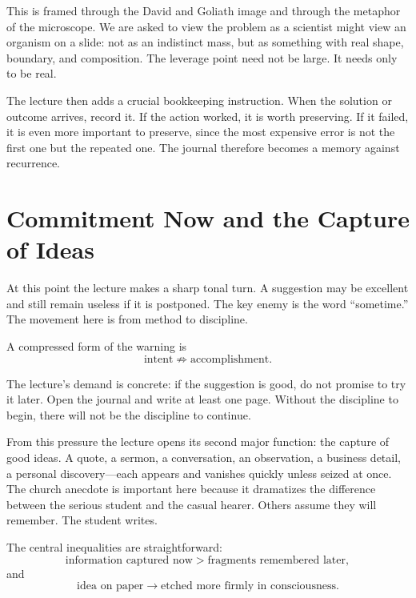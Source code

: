 This is framed through the David and Goliath image and through the metaphor of the microscope. We are asked to view the problem as a scientist might view an organism on a slide: not as an indistinct mass, but as something with real shape, boundary, and composition. The leverage point need not be large. It needs only to be real.

The lecture then adds a crucial bookkeeping instruction. When the solution or outcome arrives, record it. If the action worked, it is worth preserving. If it failed, it is even more important to preserve, since the most expensive error is not the first one but the repeated one. The journal therefore becomes a memory against recurrence.

\section{Commitment Now and the Capture of Ideas}

At this point the lecture makes a sharp tonal turn. A suggestion may be excellent and still remain useless if it is postponed. The key enemy is the word ``sometime.'' The movement here is from method to discipline.

A compressed form of the warning is
\begin{equation}
\text{intent}\not\Rightarrow \text{accomplishment}.
\end{equation}

The lecture's demand is concrete: if the suggestion is good, do not promise to try it later. Open the journal and write at least one page. Without the discipline to begin, there will not be the discipline to continue.

From this pressure the lecture opens its second major function: the capture of good ideas. A quote, a sermon, a conversation, an observation, a business detail, a personal discovery---each appears and vanishes quickly unless seized at once. The church anecdote is important here because it dramatizes the difference between the serious student and the casual hearer. Others assume they will remember. The student writes.

The central inequalities are straightforward:
\begin{equation}
\text{information captured now}>\text{fragments remembered later},
\end{equation}
and
\begin{equation}
\text{idea on paper}\rightarrow \text{etched more firmly in consciousness}.
\end{equation}

